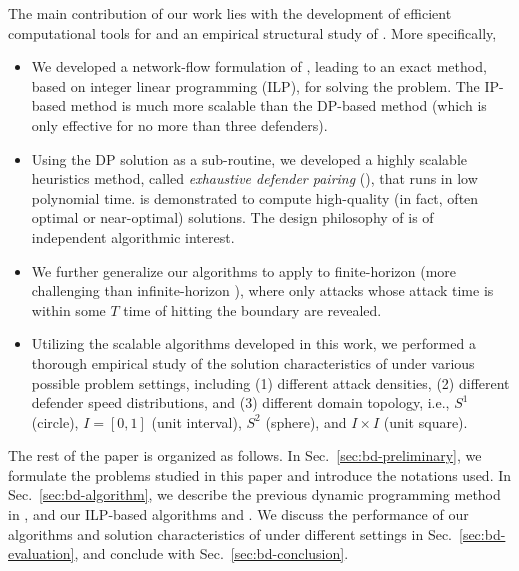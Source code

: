 The main contribution of our work lies with the development of efficient computational tools for and an empirical structural study of \prob. More specifically, 
\begin{itemize}[leftmargin=3.5mm]
\item We developed a network-flow formulation of \prob, leading to an exact method, based on integer linear programming (ILP), for solving the problem. The IP-based method is much more scalable than the DP-based method (which is only effective for no more than three defenders). 
\item Using the DP solution as a sub-routine, we developed a highly scalable heuristics method, called \emph{exhaustive defender pairing} (\ours), that runs in low polynomial time.  \ours is demonstrated to compute high-quality (in fact, often optimal or near-optimal) solutions. The design philosophy of \ours is of independent algorithmic interest. 
\item We further generalize our algorithms to apply to finite-horizon \prob (more challenging than infinite-horizon \prob), where only attacks whose attack time is within some $T$ time of hitting the boundary are revealed.
\item Utilizing the scalable algorithms developed in this work, we performed a thorough empirical study of the solution characteristics of \prob under various possible problem settings, including (1) different attack densities, (2) different defender speed distributions, and (3) different domain topology, i.e., $S^1$ (circle), $I = [0, 1]$ (unit interval), $S^2$ (sphere), and $I \times I$ (unit square). 
\end{itemize}


The rest of the paper is organized as follows. 
In Sec.~\ref{sec:bd-preliminary}, we formulate the problems studied in this paper and introduce the notations used. 
In Sec.~\ref{sec:bd-algorithm}, we describe the previous dynamic programming method in \cite{adler2022role}, 
and our ILP-based algorithms and \ours. 
We discuss the performance of our algorithms and solution characteristics of \prob under different settings in 
Sec.~\ref{sec:bd-evaluation}, 
and conclude with Sec.~\ref{sec:bd-conclusion}.

